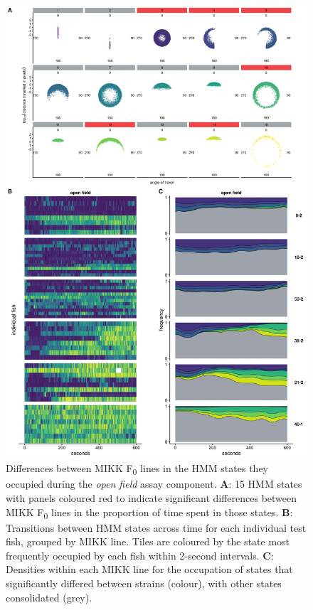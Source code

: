 \documentclass[
]{book}
\begin{document}
\begin{figure}
\includegraphics[width=1\linewidth]{figs/mikk_behaviour/select_0.08_15_dge_of} \caption{Differences between MIKK F\textsubscript{0} lines in the HMM states they occupied during the \emph{open field} assay component. \textbf{A}: 15 HMM states with panels coloured red to indicate significant differences between MIKK F\textsubscript{0} lines in the proportion of time spent in those states. \textbf{B}: Transitions between HMM states across time for each individual test fish, grouped by MIKK line. Tiles are coloured by the state most frequently occupied by each fish within 2-second intervals. \textbf{C}: Densities within each MIKK line for the occupation of states that significantly differed between strains (colour), with other states consolidated (grey).}\label{fig:F2-time-dge-of}
\end{figure}
\end{document}
